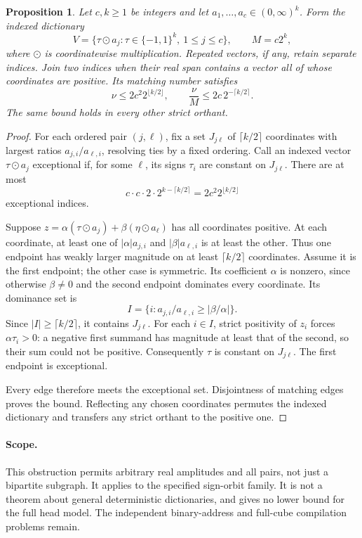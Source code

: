 \documentclass[11pt]{article}
\newtheorem{proposition}{Proposition}
\begin{document}
\begin{proposition}
Let $c,k\geq1$ be integers and let $a_1,\ldots,a_c\in(0,\infty)^k$.
Form the indexed dictionary
\[
 V=\{\tau\mathbin{\odot}a_j:
       \tau\in\{-1,1\}^k,\ 1\leq j\leq c\},\qquad M=c2^k,
\]
where $\odot$ is coordinatewise multiplication. Repeated vectors, if
any, retain separate indices. Join two indices when their real span
contains a vector all of whose coordinates are positive. Its matching
number satisfies
\[
 \nu\leq 2c^2 2^{\lfloor k/2\rfloor},\qquad
 \frac\nu M\leq 2c\,2^{-\lceil k/2\rceil}.
\]
The same bound holds in every other strict orthant.
\end{proposition}
\begin{proof}
For each ordered pair $(j,\ell)$, fix a set $J_{j\ell}$ of
$\lceil k/2\rceil$ coordinates with largest ratios
$a_{j,i}/a_{\ell,i}$, resolving ties by a fixed ordering.
Call an indexed vector $\tau\odot a_j$ exceptional if, for some
$\ell$, its signs $\tau_i$ are constant on $J_{j\ell}$.
There are at most
\[
 c\cdot c\cdot2\cdot2^{k-\lceil k/2\rceil}
   =2c^2 2^{\lfloor k/2\rfloor}
\]
exceptional indices.

Suppose
$z=\alpha(\tau\odot a_j)+\beta(\eta\odot a_\ell)$
has all coordinates positive. At each coordinate, at least one
of $|\alpha|a_{j,i}$ and $|\beta|a_{\ell,i}$ is at least the
other. Thus one endpoint has weakly larger magnitude on at least
$\lceil k/2\rceil$ coordinates. Assume it is the first endpoint;
the other case is symmetric. Its coefficient $\alpha$ is nonzero,
since otherwise $\beta\ne0$ and the second endpoint dominates
every coordinate. Its dominance set is
\[
 I=\{i:a_{j,i}/a_{\ell,i}\geq|\beta/\alpha|\}.
\]
Since $|I|\geq\lceil k/2\rceil$, it contains $J_{j\ell}$.
For each $i\in I$, strict positivity of $z_i$ forces
$\alpha\tau_i>0$: a negative first summand has magnitude at
least that of the second, so their sum could not be positive.
Consequently $\tau$ is constant on $J_{j\ell}$. The first
endpoint is exceptional.

Every edge therefore meets the exceptional set. Disjointness of
matching edges proves the bound. Reflecting any chosen coordinates
permutes the indexed dictionary and transfers any strict orthant
to the positive one.
\end{proof}

\paragraph{Scope.}
This obstruction permits arbitrary real amplitudes and all pairs,
not just a bipartite subgraph. It applies to the specified sign-orbit
family. It is not a theorem about general deterministic dictionaries,
and gives no lower bound for the full head model. The independent
binary-address and full-cube compilation problems remain.
\end{document}

